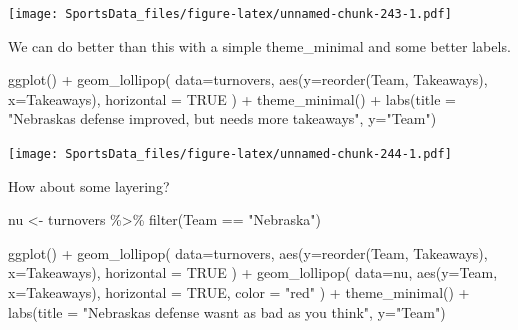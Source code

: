 \documentclass[
]{book}
\newenvironment{Shaded}{\begin{snugshade}}{\end{snugshade}}
\newcommand{\AttributeTok}[1]{\textcolor[rgb]{0.77,0.63,0.00}{#1}}
\newcommand{\ConstantTok}[1]{\textcolor[rgb]{0.00,0.00,0.00}{#1}}
\newcommand{\FunctionTok}[1]{\textcolor[rgb]{0.00,0.00,0.00}{#1}}
\newcommand{\NormalTok}[1]{#1}
\newcommand{\OtherTok}[1]{\textcolor[rgb]{0.56,0.35,0.01}{#1}}
\newcommand{\SpecialCharTok}[1]{\textcolor[rgb]{0.00,0.00,0.00}{#1}}
\newcommand{\StringTok}[1]{\textcolor[rgb]{0.31,0.60,0.02}{#1}}
\begin{document}
\texttt{[image: SportsData\_files/figure-latex/unnamed-chunk-243-1.pdf]}

We can do better than this with a simple theme\_minimal and some better labels.

\begin{Shaded}
\begin{Highlighting}[]
\FunctionTok{ggplot}\NormalTok{() }\SpecialCharTok{+} 
  \FunctionTok{geom\_lollipop}\NormalTok{(}
    \AttributeTok{data=}\NormalTok{turnovers, }
    \FunctionTok{aes}\NormalTok{(}\AttributeTok{y=}\FunctionTok{reorder}\NormalTok{(Team, Takeaways), }\AttributeTok{x=}\NormalTok{Takeaways), }
    \AttributeTok{horizontal =} \ConstantTok{TRUE}
\NormalTok{    ) }\SpecialCharTok{+} \FunctionTok{theme\_minimal}\NormalTok{() }\SpecialCharTok{+} 
  \FunctionTok{labs}\NormalTok{(}\AttributeTok{title =} \StringTok{"Nebraska\textquotesingle{}s defense improved, but needs more takeaways"}\NormalTok{, }\AttributeTok{y=}\StringTok{"Team"}\NormalTok{)}
\end{Highlighting}
\end{Shaded}

\texttt{[image: SportsData\_files/figure-latex/unnamed-chunk-244-1.pdf]}

How about some layering?

\begin{Shaded}
\begin{Highlighting}[]
\NormalTok{nu }\OtherTok{\textless{}{-}}\NormalTok{ turnovers }\SpecialCharTok{\%\textgreater{}\%} \FunctionTok{filter}\NormalTok{(Team }\SpecialCharTok{==} \StringTok{"Nebraska"}\NormalTok{)}
\end{Highlighting}
\end{Shaded}

\begin{Shaded}
\begin{Highlighting}[]
\FunctionTok{ggplot}\NormalTok{() }\SpecialCharTok{+} 
  \FunctionTok{geom\_lollipop}\NormalTok{(}
    \AttributeTok{data=}\NormalTok{turnovers, }
    \FunctionTok{aes}\NormalTok{(}\AttributeTok{y=}\FunctionTok{reorder}\NormalTok{(Team, Takeaways), }\AttributeTok{x=}\NormalTok{Takeaways), }
    \AttributeTok{horizontal =} \ConstantTok{TRUE}
\NormalTok{    ) }\SpecialCharTok{+} 
  \FunctionTok{geom\_lollipop}\NormalTok{(}
    \AttributeTok{data=}\NormalTok{nu,}
    \FunctionTok{aes}\NormalTok{(}\AttributeTok{y=}\NormalTok{Team, }\AttributeTok{x=}\NormalTok{Takeaways),}
    \AttributeTok{horizontal =} \ConstantTok{TRUE}\NormalTok{,}
    \AttributeTok{color =} \StringTok{"red"}
\NormalTok{  ) }\SpecialCharTok{+} 
  \FunctionTok{theme\_minimal}\NormalTok{() }\SpecialCharTok{+} 
  \FunctionTok{labs}\NormalTok{(}\AttributeTok{title =} \StringTok{"Nebraska\textquotesingle{}s defense wasn\textquotesingle{}t as bad as you think"}\NormalTok{, }\AttributeTok{y=}\StringTok{"Team"}\NormalTok{)}
\end{Highlighting}
\end{Shaded}
\end{document}
